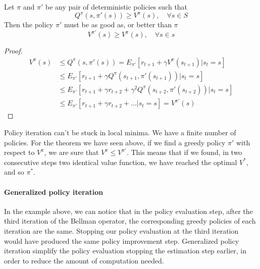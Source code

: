 \documentclass[main.tex]{subfiles}
\begin{document}
\begin{theorem}
Let $\pi$ and $\pi'$ be any pair of deterministic policies such that
\begin{equation*}
    Q^{\pi}(s, \pi'(s)) \geq V^{\pi}(s), \quad \forall s \in S
\end{equation*}
Then the policy $\pi'$ must be as good as, or better than $\pi$
\begin{equation*}
    V^{\pi'}(s) \geq V^{\pi}(s), \quad \forall s \in s
\end{equation*}
\end{theorem}
\begin{proof}
\begin{align*}
    V^{\pi}(s) &\leq Q^{\pi}(s,\pi'(s)) = E_{\pi'}[r_{t+1} + \gamma V^{\pi}(s_{t+1})|s_t=s] \\
    &\leq E_{\pi'}[r_{t+1} + \gamma Q^{\pi}(s_{t+1}, \pi'(s_{t+1}))|s_t=s] \\
    &\leq E_{\pi'}[r_{t+1} + \gamma r_{t+2} + \gamma^2 Q^{\pi}(s_{t+2}, \pi'(s_{t+2}))|s_t=s] \\
    &\leq E_{\pi'}[r_{t+1} + \gamma r_{t+2} + \dots|s_t=s] = V^{\pi'}(s)
\end{align*}
\end{proof}
\par
\noindent
Policy iteration can't be stuck in local minima. We have a finite number of policies. For the theorem we have seen above, if we find a greedy policy $\pi'$ with respect to $V^{\pi}$, we are sure that $V^{\pi} \leq V^{\pi'}$. This means that if we found, in two consecutive steps two identical value function, we have reached the optimal $V^*$, and so $\pi^*$.
\paragraph{Generalized policy iteration} In the example above, we can notice that in the policy evaluation step, after the third iteration of the Bellman operator, the corresponding greedy policies of each iteration are the same. Stopping our policy evaluation at the third iteration would have produced the same policy improvement step. Generalized policy iteration simplify the policy evaluation stopping the estimation step earlier, in order to reduce the amount of computation needed.
\end{document}
